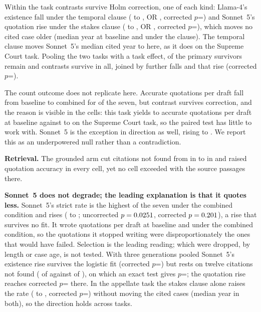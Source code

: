 \documentclass{IOS-Book-Article}
\begin{document}
Within the task \aTaskSurv{} contrasts survive Holm correction, one of each kind: Llama-4's existence fall under the temporal clause (\aExistLlamaBase{} to \aExistLlamaTemporal, OR \aOrCiteLlamaTemporal, corrected $p$=\aHolmCiteLlamaTemporal) and Sonnet~5's quotation rise under the stakes clause (\aStrictSonnetBase{} to \aStrictSonnetStakes, OR \aOrQuoteSonnetStakes, corrected $p$=\aHolmQuoteSonnetStakes), which moves no cited case older (median year \aSonnetYearBase{} at baseline and under the clause). The temporal clause moves Sonnet~5's median cited year to \aSonnetYearTemporal{} here, as it does on the Supreme Court task. Pooling the two tasks with a task effect, \aPooledKept{} of the \phrSurvA{} primary survivors remain and \aPooledSurvN{} contrasts survive in all, joined by \aPooledExtraFalls{} further falls and that rise (corrected $p$=\aPooledHolmQuoteSonnetStakes).

The count outcome does not replicate here. Accurate quotations per draft fall from baseline to combined for \aCountFallers{} of the seven, but \aCountSurvivors{} contrast survives correction, and the reason is visible in the cells: this task yields \aAccPerDraftBaseMin{} to \aAccPerDraftBaseMax{} accurate quotations per draft at baseline against \accPerDraftLlamaBase{} to \accPerDraftSonnetBase{} on the Supreme Court task, so the paired test has little to work with. Sonnet~5 is the exception in direction as well, rising \aAccPerDraftSonnetBase{} to \aAccPerDraftSonnetCombo. We report this as an underpowered null rather than a contradiction.

\textbf{Retrieval.} The grounded arm cut citations not found from \cNotFoundTotal{} in \cAdjudicableTotal{} to \gNotFoundTotal{} in \gAdjudicableTotal{} and raised quotation accuracy in every cell, yet no cell exceeded \gStrictMax{} with the source passages there.

\textbf{Sonnet~5 does not degrade; the leading explanation is that it quotes less.} Sonnet~5's strict rate is the highest of the seven under the combined condition and rises (\strictSonnetBase{} to \strictSonnetCombo; uncorrected $p=0.0251$, corrected $p=0.201$), a rise that survives no fit. It wrote \quotesPerDraftSonnetBase{} quotations per draft at baseline and \quotesPerDraftSonnetCombo{} under the combined condition, so the quotations it stopped writing were disproportionately the ones that would have failed. Selection is the leading reading; which were dropped, by length or case age, is not tested. With three generations pooled Sonnet~5's existence rise survives the logistic fit (corrected $p$=\runsHolmCiteSonnet) but rests on twelve citations not found (\sonnetRunsNfBase{} of \sonnetRunsAdjBase{} against \sonnetRunsNfCombo{} of \sonnetRunsAdjCombo), on which an exact test gives $p$=\sonnetRunsFisherP; the quotation rise reaches corrected $p$=\runsHolmQuoteSonnet{} there. In the appellate task the stakes clause alone raises the rate (\aStrictSonnetBase{} to \aStrictSonnetStakes, corrected $p$=\aHolmQuoteSonnetStakes) without moving the cited cases (median year \aSonnetYearBase{} in both), so the direction holds across tasks.
\end{document}
